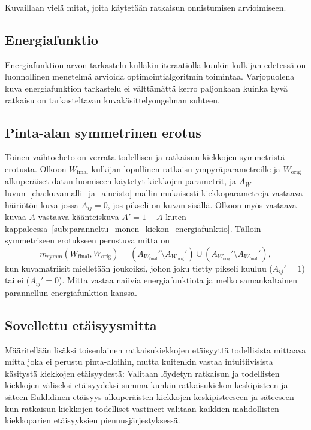 Kuvaillaan vielä mitat, joita käytetään ratkaisun onnistumisen arvioimiseen.

\subsection{Energiafunktio}
\label{sub:energiafunktio}

Energiafunktion arvon tarkastelu kullakin iteraatiolla kunkin kulkijan edetessä on luonnollinen menetelmä arvioida optimointialgoritmin toimintaa.
Varjopuolena kuva energiafunktion tarkastelu ei välttämättä kerro paljonkaan kuinka hyvä ratkaisu on tarkasteltavan kuvakäsittelyongelman suhteen.

\subsection{Pinta-alan symmetrinen erotus}
\label{sub:pinta_alan_symmetrinen_erotus}

Toinen vaihtoeheto on verrata todellisen ja ratkaisun kiekkojen symmetristä erotusta.
Olkoon $W_\text{final}$ kulkijan lopullinen ratkaisu ympyräparametreille ja $W_\text{orig}$ alkuperäiset datan luomiseen käytetyt kiekkojen parametrit,
ja $A_W$ luvun~\ref{cha:kuvamalli_ja_aineisto} mallin mukaisesti kiekkoparametreja vastaava häiriötön kuva jossa $A_{ij} = 0$, jos pikseli on kuvan sisällä.
Olkoon myös vastaava kuvaa $A$ vastaava käänteiskuva $A' = 1 - A$ kuten kappaleessa~\ref{sub:paranneltu_monen_kiekon_energiafunktio}.
Tälloin symmetriseen erotukseen perustuva mitta on
\begin{equation*}
    m_\text{symm}(W_\text{final}, W_\text{orig}) = (A_{W_\text{final}}' \setminus A_{W_\text{orig}}') \cup (A_{W_\text{orig}}' \setminus A_{W_\text{final}}'),
\end{equation*}
kun kuvamatriisit mielletään joukoiksi, johon joku tietty pikseli kuuluu ($A_{ij}' = 1$) tai ei ($A_{ij}' = 0$).
Mitta vastaa naiivia energiafunktiota ja melko samankaltainen parannellun energiafunktion kanssa.

\subsection{Sovellettu etäisyysmitta}
\label{sub:sovellettu_etaisyysmitta}

Määritellään lisäksi toisenlainen ratkaisukiekkojen etäisyyttä todellisista mittaava mitta joka ei perustu pinta-aloihin,
mutta kuitenkin vastaa intuitiivisista käsitystä kiekkojen etäisyydestä:
Valitaan löydetyn ratkaisun ja todellisten kiekkojen väliseksi etäisyydeksi summa kunkin ratkaisukiekon keskipisteen ja säteen Euklidinen etäisyys alkuperäisten kiekkojen keskipisteeseen ja säteeseen
kun ratkaisun kiekkojen todelliset vastineet valitaan kaikkien mahdollisten kiekkoparien etäisyyksien pienuusjärjestyksessä.

